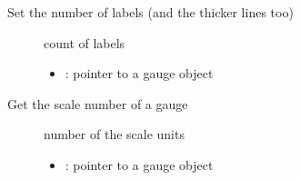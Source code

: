 \documentclass[letterpaper,10pt,english]{sphinxmanual}
\begin{document}

\begin{fulllineitems}
\label{\detokenize{object-types/gauge:_CPPv424lv_gauge_get_label_countPK8lv_obj_t}}%
\pysigstartmultiline
{}\label{\detokenize{object-types/gauge:lv__gauge_8h_1a1a7fd5fa37a7296b382bce56312966dd}}%
\pysigstopmultiline
Set the number of labels (and the thicker lines too) \begin{description}
\item[{}] \leavevmode
count of labels 

\item[{}] \leavevmode\begin{itemize}
\item {} 
: pointer to a gauge object 

\end{itemize}

\end{description}


\end{fulllineitems}


\begin{fulllineitems}
\label{\detokenize{object-types/gauge:_CPPv423lv_gauge_get_line_countPK8lv_obj_t}}%
\pysigstartmultiline
{}\label{\detokenize{object-types/gauge:lv__gauge_8h_1a15086d2c3e0f36475be94c13ed130805}}%
\pysigstopmultiline
Get the scale number of a gauge \begin{description}
\item[{}] \leavevmode
number of the scale units 

\item[{}] \leavevmode\begin{itemize}
\item {} 
: pointer to a gauge object 

\end{itemize}

\end{description}


\end{fulllineitems}
\end{document}
